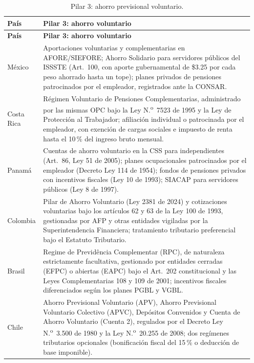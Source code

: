 \documentclass[12pt, letterpaper]{article}
\begin{document}
\begin{xltabular}{\textwidth}{P{2.1cm}Y}
\caption{Pilar 3: ahorro previsional voluntario.}
\label{tab:pilar3}\\
\toprule
\textbf{País} & \textbf{Pilar 3: ahorro voluntario} \\
\midrule
\endfirsthead

\toprule
\textbf{País} & \textbf{Pilar 3: ahorro voluntario} \\
\midrule
\endhead

\bottomrule
\endfoot

México &
Aportaciones voluntarias y complementarias en AFORE/SIEFORE; Ahorro Solidario para servidores públicos del ISSSTE (Art.\ 100, con aporte gubernamental de \$3.25 por cada peso ahorrado hasta un tope); planes privados de pensiones patrocinados por el empleador, registrados ante la CONSAR. \\

Costa Rica &
Régimen Voluntario de Pensiones Complementarias, administrado por las mismas OPC bajo la Ley N.\textsuperscript{o}~7523 de 1995 y la Ley de Protección al Trabajador; afiliación individual o patrocinada por el empleador, con exención de cargas sociales e impuesto de renta hasta el 10\,\% del ingreso bruto mensual. \\

Panamá &
Cuentas de ahorro voluntario en la CSS para independientes (Art.\ 86, Ley 51 de 2005); planes ocupacionales patrocinados por el empleador (Decreto Ley 114 de 1954); fondos de pensiones privados con incentivos fiscales (Ley 10 de 1993); SIACAP para servidores públicos (Ley 8 de 1997). \\

Colombia &
Pilar de Ahorro Voluntario (Ley 2381 de 2024) y cotizaciones voluntarias bajo los artículos 62 y 63 de la Ley 100 de 1993, gestionadas por AFP y otras entidades vigiladas por la Superintendencia Financiera; tratamiento tributario preferencial bajo el Estatuto Tributario. \\

Brasil &
Regime de Previdência Complementar (RPC), de naturaleza estrictamente facultativa, gestionado por entidades cerradas (EFPC) o abiertas (EAPC) bajo el Art.\ 202 constitucional y las Leyes Complementarias 108 y 109 de 2001; incentivos fiscales diferenciados según los planes PGBL y VGBL. \\

Chile &
Ahorro Previsional Voluntario (APV), Ahorro Previsional Voluntario Colectivo (APVC), Depósitos Convenidos y Cuenta de Ahorro Voluntario (Cuenta 2), regulados por el Decreto Ley N.\textsuperscript{o}~3.500 de 1980 y la Ley N.\textsuperscript{o}~20.255 de 2008; dos regímenes tributarios opcionales (bonificación fiscal del 15\,\% o deducción de base imponible). \\

\end{xltabular}
\end{document}
